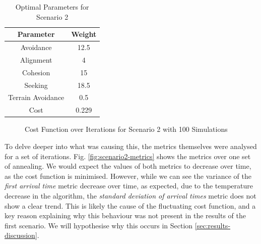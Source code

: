 \documentclass[12pt]{article}
\begin{document}
\begin{table}[ht]
    \centering
    \begin{tabular}{|c|c|}
        \hline
        Parameter & Weight \\
        \hline
        Avoidance & 12.5 \\
        \hline
        Alignment & 4 \\
        \hline
        Cohesion & 15 \\
        \hline
        Seeking & 18.5 \\
        \hline
        Terrain Avoidance & 0.5 \\
        \hline \hline
        Cost & 0.229 \\
        \hline
    \end{tabular}
    \caption{Optimal Parameters for Scenario 2}
    \label{tab:scenario2-parameters}
\end{table}

\begin{figure}[ht]
    \centering
    \caption{Cost Function over Iterations for Scenario 2 with 100 Simulations}
    \label{fig:scenario2-cost-100}
\end{figure}

To delve deeper into what was causing this, the metrics themselves were analysed for a set of iterations. Fig. \ref{fig:scenario2-metrics} shows the metrics over one set of annealing. We would expect the values of both metrics to decrease over time, as the cost function is minimised. However, while we can see the variance of the \emph{first arrival time} metric decrease over time, as expected, due to the temperature decrease in the algorithm, the \emph{standard deviation of arrival times} metric does not show a clear trend. This is likely the cause of the fluctuating cost function, and a key reason explaining why this behaviour was not present in the results of the first scenario. We will hypothesise why this occurs in Section \ref{sec:results-discussion}.
\end{document}
